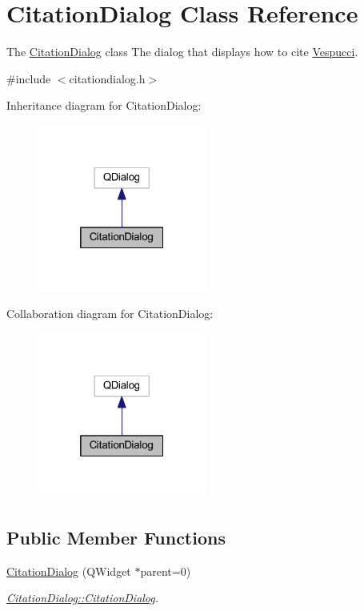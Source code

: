 \hypertarget{class_citation_dialog}{\section{Citation\+Dialog Class Reference}
\label{class_citation_dialog}
}


The \hyperlink{class_citation_dialog}{Citation\+Dialog} class The dialog that displays how to cite \hyperlink{namespace_vespucci}{Vespucci}.  




{\ttfamily \#include $<$citationdialog.\+h$>$}



Inheritance diagram for Citation\+Dialog\+:\nopagebreak
\begin{figure}[H]
\begin{center}
\leavevmode
\includegraphics[width=157pt]{class_citation_dialog__inherit__graph}
\end{center}
\end{figure}


Collaboration diagram for Citation\+Dialog\+:\nopagebreak
\begin{figure}[H]
\begin{center}
\leavevmode
\includegraphics[width=157pt]{class_citation_dialog__coll__graph}
\end{center}
\end{figure}
\subsection*{Public Member Functions}
\begin{DoxyCompactItemize}
\item 
\hyperlink{class_citation_dialog_a566d6d063e20f68d619ff15412bda2f0}{Citation\+Dialog} (Q\+Widget $\ast$parent=0)
\begin{DoxyCompactList}\small\item\em \hyperlink{class_citation_dialog_a566d6d063e20f68d619ff15412bda2f0}{Citation\+Dialog\+::\+Citation\+Dialog}. \end{DoxyCompactList}\end{DoxyCompactItemize}


